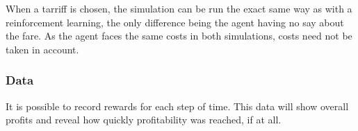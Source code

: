 When a tarriff is chosen, the simulation can be run the exact same way as with
a reinforcement learning, the only difference being the agent having no say
about the fare. As the agent faces the same costs in both simulations, costs
need not be taken in account.

\subsubsection{Data}

It is possible to record rewards for each step of time. This data will show
overall profits and reveal how quickly profitability was reached, if at all.
